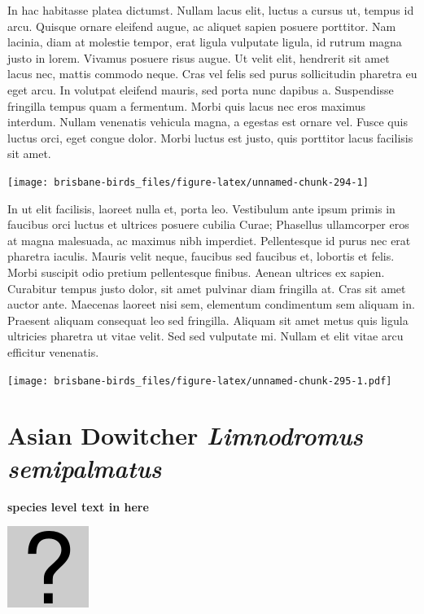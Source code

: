 \documentclass[]{book}
\let\origfigure\figure
\let\endorigfigure\endfigure
\renewenvironment{figure}[1][2] {
  \expandafter\origfigure\expandafter[H]
} {
  \endorigfigure
}
\begin{document}
In hac habitasse platea dictumst. Nullam lacus elit, luctus a cursus ut,
tempus id arcu. Quisque ornare eleifend augue, ac aliquet sapien posuere
porttitor. Nam lacinia, diam at molestie tempor, erat ligula vulputate
ligula, id rutrum magna justo in lorem. Vivamus posuere risus augue. Ut
velit elit, hendrerit sit amet lacus nec, mattis commodo neque. Cras vel
felis sed purus sollicitudin pharetra eu eget arcu. In volutpat eleifend
mauris, sed porta nunc dapibus a. Suspendisse fringilla tempus quam a
fermentum. Morbi quis lacus nec eros maximus interdum. Nullam venenatis
vehicula magna, a egestas est ornare vel. Fusce quis luctus orci, eget
congue dolor. Morbi luctus est justo, quis porttitor lacus facilisis sit
amet.

\begin{figure}
\texttt{[image: brisbane-birds\_files/figure-latex/unnamed-chunk-294-1]} \caption{insert figure caption}\label{fig:unnamed-chunk-294}
\end{figure}

In ut elit facilisis, laoreet nulla et, porta leo. Vestibulum ante ipsum
primis in faucibus orci luctus et ultrices posuere cubilia Curae;
Phasellus ullamcorper eros at magna malesuada, ac maximus nibh
imperdiet. Pellentesque id purus nec erat pharetra iaculis. Mauris velit
neque, faucibus sed faucibus et, lobortis et felis. Morbi suscipit odio
pretium pellentesque finibus. Aenean ultrices ex sapien. Curabitur
tempus justo dolor, sit amet pulvinar diam fringilla at. Cras sit amet
auctor ante. Maecenas laoreet nisi sem, elementum condimentum sem
aliquam in. Praesent aliquam consequat leo sed fringilla. Aliquam sit
amet metus quis ligula ultricies pharetra ut vitae velit. Sed sed
vulputate mi. Nullam et elit vitae arcu efficitur venenatis.

\begin{figure}
\centering
\texttt{[image: brisbane-birds\_files/figure-latex/unnamed-chunk-295-1.pdf]}
\caption{\label{fig:unnamed-chunk-295}insert figure caption}
\end{figure}

\section{\texorpdfstring{Asian Dowitcher \emph{Limnodromus
semipalmatus}}{Asian Dowitcher Limnodromus semipalmatus}}\label{asian-dowitcher-limnodromus-semipalmatus}

\textbf{species level text in here}

\begin{figure}
\centering
\includegraphics{assets/missing.png}
\caption{No image for species}
\end{figure}
\end{document}
